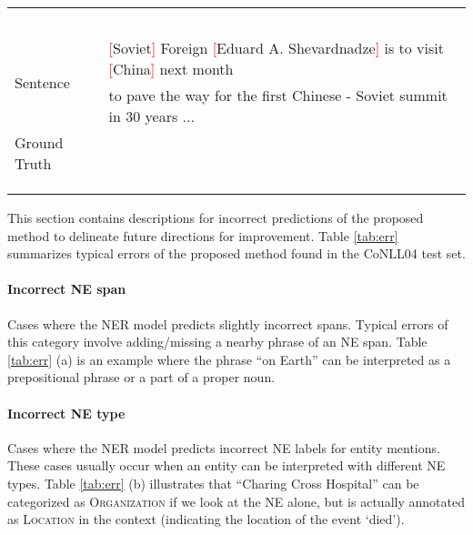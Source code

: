 \documentclass[11pt,a4paper]{article}
\begin{document}
\begin{table*}[t]
\begin{tabular}{ll}
    &  \\
    & \\
    \hdashline
    \multirow{2}{*}{Prediction} &  \\
    &  \\
    \Xhline{2\arrayrulewidth}
    \multicolumn{2}{c}{\textbf{(d)} Lack of global constraints} \\
    \hline
    \multirow{2}{*}{Sentence}  & \textcolor{red}{[}Soviet\textcolor{red}{]} Foreign \textcolor{red}{[}Eduard A. Shevardnadze\textcolor{red}{]} is to visit \textcolor{red}{[}China\textcolor{red}{]} next month \\
    & to pave the way for the first Chinese - Soviet summit in 30 years ... \\
    \hdashline
    Ground Truth &  \\   
    \hdashline
    \multirow{2}{*}{Prediction} &  \\  
    &  \\  
    \Xhline{3\arrayrulewidth}      
    \end{tabular}
    \caption{Typical error cases of the proposed method on the CoNLL04 test set. Cases \textbf{(a)} and \textbf{(b)} are errors caused by the NER model; and Cases \textbf{(c)} and \textbf{(d)} are those caused by the RE model. Each RE case shows the sentence with the NE labels in the first line, followed by relation tuples of the ground truth annotation and the prediction.} 
    \label{tab:err}
\end{table*}

This section contains descriptions for incorrect predictions of the proposed method to delineate future directions for improvement. Table \ref{tab:err} summarizes typical errors of the proposed method found in the CoNLL04 test set.

\paragraph{Incorrect NE span} Cases where the NER model predicts slightly incorrect spans. Typical errors of this category involve adding/missing a nearby phrase of an NE span. Table \ref{tab:err} (a) is an example where the phrase ``on Earth'' can be interpreted as a prepositional phrase or a part of a proper noun.

\paragraph{Incorrect NE type} Cases where the NER model predicts incorrect NE labels for entity mentions. These cases usually occur when an entity can be interpreted with different NE types. Table \ref{tab:err} (b) illustrates that ``Charing Cross Hospital'' can be categorized as \textsc{Organization} if we look at the NE alone, but is actually annotated as \textsc{Location} in the context (indicating the location of the event `died').
\end{document}
